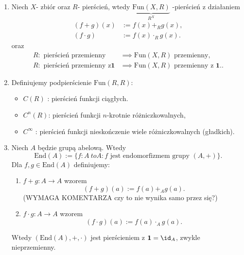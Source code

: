 \begin{enumerate}[label=\arabic*)]
	Wtedy $\left( M_{n}\left( \mathbb{R}  \right)  \right) $ to pierścień z $\mathbf{1}$, tzn.
	\[
		\mathbf{1} = \mathcal{I} = \begin{pmatrix} \mathbf{1}_{R} & \ldots & 0 \\ \vdots & \ddots & \vdots \\ 0 & \ldots & \mathbf{1}_{R} \end{pmatrix} 
	.\] 
	Czyli przykładowo mamy pierścień $M_3\left( \mathbb{Z}_{3} \right) $.
	\item Niech $X$- zbiór oraz $R$- pierścień, wtedy $\underbrace{\text{Fun}\left( X,R \right)}_{R^{X}}$ -pierścień z działaniem 
		\begin{align*}
			\left( f + g \right) \left( x \right) &:= f\left( x \right) +_{R} g\left( x \right), \\
			\left( f \cdot g \right) &:= f\left( x \right) \cdot_{R} g\left( x \right) 
		.\end{align*}
		oraz
		\begin{align*}
			R: \text{ pierścień przemienny } &\implies \text{Fun}\left( X,R \right) \text{ przemienny},\\
			R: \text{ pierścień przemienny z} \mathbf{1} &\implies \text{Fun}\left( X,R \right) \text{ przemienny z } \mathbf{1}.
		.\end{align*}
	\item Definiujemy podpierścienie $\text{Fun}\left( R, R \right)$:
		\begin{itemize}
			\item $C\left( R \right) $ : pierścień funkcji ciągłych.
			\item $C^{n}\left( R \right)$: pierścień funkcji $n$-krotnie różniczkowalnych,
			\item $C^{\infty}$ : pierścień funkcji nieskończenie wiele różniczkowalnych (gładkich).
		\end{itemize}
	\item Niech $A$ będzie grupą abelową. Wtedy
		\[
		\text{End}\left( A \right) := \{f: A\ to A: f \text{ jest endomorfizmem grupy }\left( A,+ \right) \}
		.\] 
		Dla $f,g \in \text{End}\left( A \right) $ definiujemy:
		\begin{enumerate}[label=\roman*)]
			\item $f+g: A \to A$ wzorem
				\[
					\left( f+g \right) \left( a \right) := f\left( a \right) +_{A} g\left( a \right) 
				.\]
			(WYMAGA KOMENTARZA czy to nie wynika samo przez się?)
		        \item $f\cdot g: A \to A$ wzorem
				\[
					\left( f\cdot g \right)\left( a \right) := f\left( a \right) \cdot_{A} g\left( a \right) 
				.\] 
		\end{enumerate}
		Wtedy $\left( \text{End}\left( A \right), +, \cdot  \right) $ jest pierścieniem z $\mathbf{1}=\id_{A}$, zwykle nieprzemienny.
\end{enumerate}
